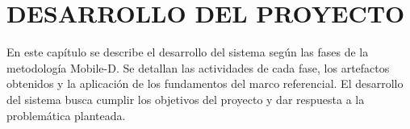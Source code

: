 \chapter{DESARROLLO DEL PROYECTO}
\label{cap:desarrollo}


En este capítulo se describe el desarrollo del sistema según las fases de
la metodología Mobile-D. Se detallan las actividades de cada fase, los
artefactos obtenidos y la aplicación de los fundamentos del marco referencial.
El desarrollo del sistema busca cumplir los objetivos del proyecto y dar
respuesta a la problemática planteada.






